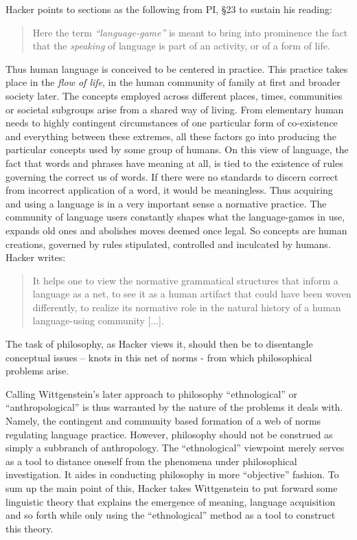 \documentclass{article}
\begin{document}
Hacker points to sections as the following from PI, §23 to sustain his reading:
\begin{quote}
Here the term \textit{``language-game''} is meant to bring into prominence
the fact that the \textit{speaking} of language is part of an activity, or of a form
of life.
\end{quote}
Thus human language is conceived to be centered in practice. This practice takes place in the \textit{flow of life}, in the human community of family at first and broader society later. The concepts employed across different places, times, communities or societal subgroups arise from a shared way of living. From elementary human needs to highly contingent circumstances of one particular form of co-existence and everything between these extremes, all these factors go into producing the particular concepts used by some group of humans.
On this view of language, the fact that words and phrases have meaning at all, is tied to the existence of rules governing the correct us of words. If there were no standards to discern correct from incorrect application of a word, it would be meaningless. 
Thus acquiring and using a language is in a very important sense a normative practice. The community of language users constantly shapes what the language-games in use, expands old ones and abolishes moves deemed once legal.
So concepts are human creations, governed by rules stipulated, controlled and inculcated by humans. Hacker writes: 
\begin{quote}
It helps one to view the normative grammatical structures that inform a language as a net, to see it as a human artifact that could have been woven differently, to realize its normative role in the natural history of a human language-using community [...].
\end{quote} %
The task of philosophy, as Hacker views it, should then be to disentangle conceptual issues – knots in this net of norms - from which philosophical problems arise.

 Calling Wittgenstein's later approach to philosophy ``ethnological'' or ``anthropological'' is thus warranted by the nature of the problems it deals with. Namely, the contingent and community based formation of a web of norms regulating language practice. However, philosophy should not be construed as simply a subbranch of anthropology. The ``ethnological'' viewpoint merely serves as a tool to distance oneself from the phenomena under philosophical investigation. It aides in conducting philosophy in more ``objective'' fashion.
To sum up the main point of this, Hacker takes Wittgenstein to put forward some linguistic theory that explains the emergence of meaning, language acquisition and so forth while only using the ``ethnological'' method as a tool to construct this theory.
\end{document}
